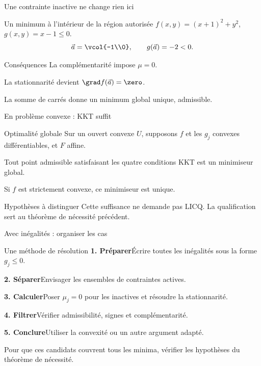 \begin{frame}[t]{Une contrainte inactive ne change rien ici}
\coursanalyse
\begin{exemple}{Un minimum à l’intérieur de la région autorisée}
$f(x,y)=(x+1)^2+y^2$,\quad $g(x,y)=x-1\le0$.
\[\vec a=\vcol{-1\\0},\qquad g(\vec a)=-2<0.\]
\end{exemple}
\begin{resultat}{Conséquences}
La complémentarité impose $\mu=0$.
\par La stationnarité devient $\grad f(\vec a)=\zero$.
\par La somme de carrés donne un minimum global unique, admissible.
\end{resultat}
\end{frame}

\begin{frame}[t]{En problème convexe : KKT suffit}
\coursanalyse
\begin{theoreme}{Optimalité globale}
Sur un ouvert convexe $U$, supposons $f$ et les $g_j$ convexes différentiables, et $F$ affine.
\medskip\par Tout point admissible satisfaisant les quatre conditions KKT est un minimiseur global.
\medskip\par Si $f$ est strictement convexe, ce minimiseur est unique.
\end{theoreme}
\begin{resultat}{Hypothèses à distinguer}
Cette suffisance ne demande pas LICQ. La qualification sert au théorème de nécessité précédent.
\end{resultat}
\end{frame}

\begin{frame}[t]{Avec inégalités : organiser les cas}
\coursanalyse
\begin{cours}{Une méthode de résolution}
\textbf{1. Préparer}\quad Écrire toutes les inégalités sous la forme $g_j\le0$.
\medskip\par\textbf{2. Séparer}\quad Envisager les ensembles de contraintes actives.
\medskip\par\textbf{3. Calculer}\quad Poser $\mu_j=0$ pour les inactives et résoudre la stationnarité.
\medskip\par\textbf{4. Filtrer}\quad Vérifier admissibilité, signes et complémentarité.
\medskip\par\textbf{5. Conclure}\quad Utiliser la convexité ou un autre argument adapté.
\end{cours}\vfill Pour que ces candidats couvrent tous les minima, vérifier les hypothèses du théorème de nécessité.
\end{frame}

